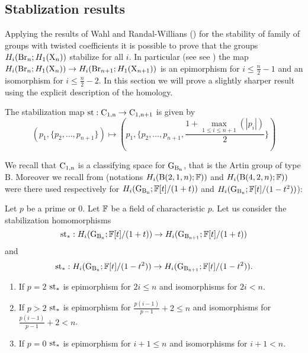

\subsection{Stablization results}
Applying the results of Wahl and Randal-Willians (\cite{W-RW}) for the stability of family of groups with twisted coefficients  it is possible to prove  that the groups $H_i(\operatorname{Br}_n; H_1(\mathrm{X}_n))$ stabilize for all $i$. 
In particular (see see \cite[Thm.~52]{bianchi}) the map $H_i(\operatorname{Br}_n; H_1(\mathrm{X}_n)) \to H_i(\operatorname{Br}_{n+1}; H_1(\mathrm{X}_{n+1}))$ is an epimorphism for $i \leq \frac{n}{2}-1$ and an isomorphism for $i \leq \frac{n}{2}-2$.
In this section  we will prove a slightly sharper result using the explicit description of the homology.

\begin{df}
	The stabilization map $\mathrm{st}: \operatorname{C_{1,n}} \to \operatorname{C_{1,n+1}}$ is given by 
	$$
	(p_1, \{p_2, \ldots, p_{n+1}\}) \mapsto (p_1, \{p_2, \ldots, p_{n+1}, \frac{1+\max_{1 \leq i \leq n+1} (|p_i|)}{2} \}) 
	$$
\end{df}

We recall that $\operatorname{C_{1,n}}$ is a classifying space for $\operatorname{G_{B_{n}}}$, that is the Artin group of type $\mathrm{B}$. Moreover we recall from \cite[Cor.~4.17, 4.18,4.19]{calmar} (notations $H_i(\mathrm{B}(2,1,n); \mathbb{F}))$ and $H_i(\mathrm{B}(4,2,n); \mathbb{F}))$ were there used respectively for $H_i(\operatorname{G_{B_{n}}}; \mathbb{F}[t]/(1+t))$ and $H_i(\operatorname{G_{B_{n}}}; \mathbb{F}[t]/(1-t^2))$):
\begin{prop}\label{prop:stab_rank}
Let $p$ be a prime or $0$. Let $\mathbb{F}$ be a field of characteristic $p$. Let us consider the stabilization homomorphisms
$$
\mathrm{st}_*:H_i(\operatorname{G_{B_{n}}}; \mathbb{F}[t]/(1+t)) \to H_i(\operatorname{G_{B_{n+1}}}; \mathbb{F}[t]/(1+t))
$$
and
$$
\mathrm{st}_*:H_i(\operatorname{G_{B_{n}}}; \mathbb{F}[t]/(1-t^2)) \to H_i(\operatorname{G_{B_{n+1}}}; \mathbb{F}[t]/(1-t^2)).
$$
\begin{enumerate}[label=\alph*)]
\item If $p=2$ $\mathrm{st}_*$ is epimorphism for $2i \leq n$ and isomorphisms for $2i < n$.
\item If $p>2$ $\mathrm{st}_*$ is epimorphism for $\frac{p(i-1)}{p-1}+2 \leq n$ and isomorphisms for $\frac{p(i-1)}{p-1}+2 < n$.
\item If $p=0$ $\mathrm{st}_*$ is epimorphism for $i+1 \leq n$ and isomorphisms for $i+1 < n$.
\end{enumerate}
\end{prop}

